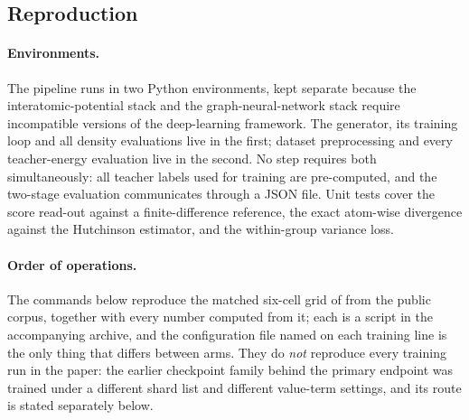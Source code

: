 \subsection{Reproduction}
\label{app:repro}

\paragraph{Environments.} The pipeline runs in two Python environments, kept separate
because the interatomic-potential stack and the graph-neural-network stack require
incompatible versions of the deep-learning framework. The generator, its training loop and
all density evaluations live in the first; dataset preprocessing and every teacher-energy
evaluation live in the second. No step requires both simultaneously: all teacher labels used
for training are pre-computed, and the two-stage evaluation communicates through a JSON
file. Unit tests cover the score read-out against a finite-difference reference, the exact
atom-wise divergence against the Hutchinson estimator, and the within-group variance loss.

\paragraph{Order of operations.} The commands below reproduce the matched six-cell grid of
 from the public corpus, together with every number computed from it; each
is a script in the accompanying archive, and the configuration file named on each training
line is the only thing that differs between arms. They do \emph{not} reproduce every training
run in the paper: the earlier checkpoint family behind the primary endpoint was trained under
a different shard list and different value-term settings, and its route is stated separately
below.


